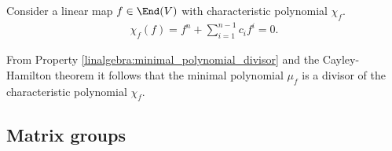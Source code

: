     \begin{theorem}\label{linalgebra:cayley_hamilton}
        Consider a linear map $f\in\End(V)$ with characteristic polynomial $\chi_f$.
        \begin{gather}
            \chi_f(f) = f^n + \sum_{i=1}^{n-1}c_if^i=0.
        \end{gather}
    \end{theorem}
    \begin{result}
        From Property \ref{linalgebra:minimal_polynomial_divisor} and the Cayley-Hamilton theorem it follows that the minimal polynomial $\mu_f$ is a divisor of the characteristic polynomial $\chi_f$.
    \end{result}

\subsection{Matrix groups}\label{section:linear_groups}


